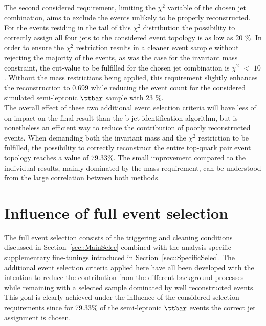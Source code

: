 The second considered requirement, limiting the $\chi^{2}$ variable of the chosen jet combination, aims to exclude the events unlikely to be properly reconstructed.
For the events residing in the tail of this $\chi^{2}$ distribution the possibility to correctly assign all four jets to the considered event topology is as low as 20 $\%$.
In order to ensure the $\chi^{2}$ restriction results in a cleaner event sample without rejecting the majority of the events, as was the case for the invariant mass constraint, the cut-value to be fulfilled for the chosen jet combination is $\chi^{2}$ $<$ $10$.
Without the mass restrictions being applied, this requirement slightly enhances the reconstruction to 0.699 while reducing the event count for the considered simulated semi-leptonic $\ttbar$ sample with 23 $\%$.
\\

The overall effect of these two additional event selection criteria will have less of on impact on the final result than the b-jet identification algorithm, but is nonetheless an efficient way to reduce the contribution of poorly reconstructed events.
When demanding both the invariant mass and the $\chi^{2}$ restriction to be fulfilled, the possibility to correctly reconstruct the entire top-quark pair event topology reaches a value of $79.33\%$.
The small improvement compared to the individual results, mainly dominated by the mass requirement, can be understood from the large correlation between both methods.

\section{Influence of full event selection} %
The full event selection consists of the triggering and cleaning conditions discussed in Section~\ref{sec::MainSelec} combined with the analysis-specific supplementary fine-tunings introduced in Section~\ref{sec::SpecificSelec}.
The additional event selection criteria applied here have all been developed with the intention to reduce the contribution from the different background processes while remaining with a selected sample dominated by well reconstructed events.
This goal is clearly achieved under the influence of the considered selection requirements
since for 79.33$\%$ of the semi-leptonic $\ttbar$ events the correct jet assignment is chosen.
\\

